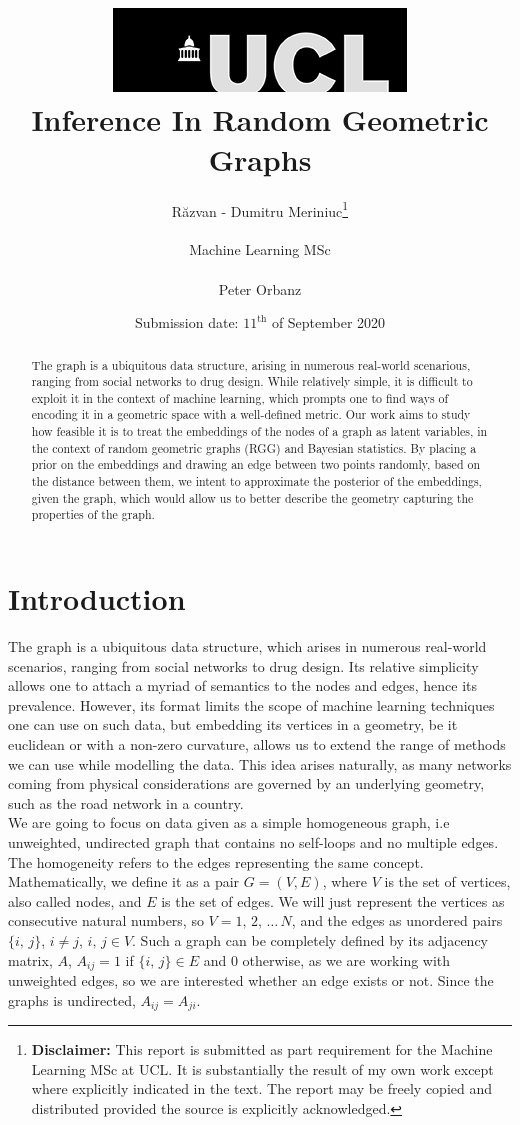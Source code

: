 \documentclass[12pt]{report}
\title{  	{ \includegraphics[scale=.5]{ucl_logo.png}}\\
{{\Huge Inference In Random Geometric Graphs}}\\
		}
\date{Submission date: $11^\text{th}$ of September 2020}
\author{R\u{a}zvan - Dumitru Meriniuc\thanks{
{\bf Disclaimer:}
This report is submitted as part requirement for the Machine Learning MSc at UCL. It is
substantially the result of my own work except where explicitly indicated in the text.
The report may be freely copied and distributed provided the source is explicitly acknowledged.}
\\ \\
Machine Learning MSc\\ \\
Peter Orbanz}
\begin{document}
 
\maketitle
\begin{abstract}
    The graph is a ubiquitous data structure, arising in numerous real-world scenarious, ranging from social networks to drug design. While relatively simple, it is difficult to exploit it in the context of machine learning, which prompts one to find ways of encoding it in a geometric space with a well-defined metric. Our work aims to study how feasible it is to treat the embeddings of the nodes of a graph as latent variables, in the context of random geometric graphs (RGG) and Bayesian statistics. By placing a prior on the embeddings and drawing an edge between two points randomly, based on the distance between them, we intent to approximate the posterior of the embeddings, given the graph, which would allow us to better describe the geometry capturing the properties of the graph.

\end{abstract}
\tableofcontents
\setcounter{page}{1}


\chapter{Introduction}
The graph is a ubiquitous data structure, which arises in numerous real-world scenarios, ranging from social networks to drug design. Its relative simplicity allows one to attach a myriad of semantics to the nodes and edges, hence its prevalence. However, its format limits the scope of machine learning techniques one can use on such data, but embedding its vertices in a geometry, be it euclidean or with a non-zero curvature, allows us to extend the range of methods we can use while modelling the data. This idea arises naturally, as many networks coming from physical considerations are governed by an underlying geometry, such as the road network in a country. \\

We are going to focus on data given as a simple homogeneous graph, i.e unweighted, undirected graph that contains no self-loops and no multiple edges\parencite{simplegraphdef}. The homogeneity refers to the edges representing the same concept. Mathematically, we define it as a pair $G = (V, E)$, where $V$ is the set of vertices, also called nodes, and $E$ is the set of edges. We will just represent the vertices as consecutive natural numbers, so $V = {1,\,2,\,\dots\,N}$, and the edges as unordered pairs $\{i,\, j\}$, $i \neq j$, $i,\,j \in V$. Such a graph can be completely defined by its adjacency matrix, $A$, $A_{ij} = 1$ if $\{i,\,j\} \in E$ and 0 otherwise, as we are working with unweighted edges, so we are interested whether an edge exists or not. Since the graphs is undirected, $A_{ij} = A_{ji}$. \\
\end{document}
